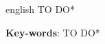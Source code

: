 \begin{resumo}[Abstract]
 \begin{otherlanguage*}{english}
    TO DO*
   \vspace{\onelineskip}

   \noindent
   \textbf{Key-words}: TO DO*
 \end{otherlanguage*}
\end{resumo}
